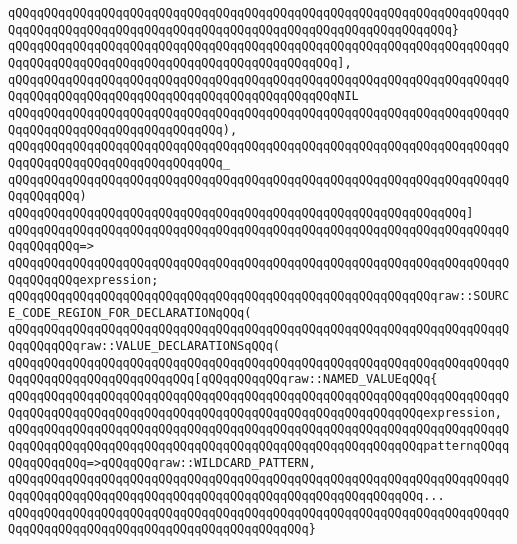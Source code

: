 \verb|qQQqqQQqqQQqqQQqqQQqqQQqqQQqqQQqqQQqqQQqqQQqqQQqqQQqqQQqqQQqqQQqqQQqqQQqqQQqqQQqqQQqqQQqqQQqqQQqqQQqqQQqqQQqqQQqqQQqqQQqqQQqqQQqqQQq}|\newline
\verb|qQQqqQQqqQQqqQQqqQQqqQQqqQQqqQQqqQQqqQQqqQQqqQQqqQQqqQQqqQQqqQQqqQQqqQQqqQQqqQQqqQQqqQQqqQQqqQQqqQQqqQQqqQQqqQQqqQQq],|\newline
\verb|qQQqqQQqqQQqqQQqqQQqqQQqqQQqqQQqqQQqqQQqqQQqqQQqqQQqqQQqqQQqqQQqqQQqqQQqqQQqqQQqqQQqqQQqqQQqqQQqqQQqqQQqqQQqqQQqqQQqNIL|\newline
\verb|qQQqqQQqqQQqqQQqqQQqqQQqqQQqqQQqqQQqqQQqqQQqqQQqqQQqqQQqqQQqqQQqqQQqqQQqqQQqqQQqqQQqqQQqqQQqqQQqqQQq),|\newline
\verb|qQQqqQQqqQQqqQQqqQQqqQQqqQQqqQQqqQQqqQQqqQQqqQQqqQQqqQQqqQQqqQQqqQQqqQQqqQQqqQQqqQQqqQQqqQQqqQQqqQQq_|\newline
\verb|qQQqqQQqqQQqqQQqqQQqqQQqqQQqqQQqqQQqqQQqqQQqqQQqqQQqqQQqqQQqqQQqqQQqqQQqqQQqqQQq)|\newline
\verb|qQQqqQQqqQQqqQQqqQQqqQQqqQQqqQQqqQQqqQQqqQQqqQQqqQQqqQQqqQQqqQQq]|\newline
\verb|qQQqqQQqqQQqqQQqqQQqqQQqqQQqqQQqqQQqqQQqqQQqqQQqqQQqqQQqqQQqqQQqqQQqqQQqqQQqqQQq=>|\newline
\verb|qQQqqQQqqQQqqQQqqQQqqQQqqQQqqQQqqQQqqQQqqQQqqQQqqQQqqQQqqQQqqQQqqQQqqQQqqQQqqQQqexpression;|\newline
\newline
\verb|qQQqqQQqqQQqqQQqqQQqqQQqqQQqqQQqqQQqqQQqqQQqqQQqqQQqqQQqqQQqraw::SOURCE_CODE_REGION_FOR_DECLARATIONqQQq(|\newline
\verb|qQQqqQQqqQQqqQQqqQQqqQQqqQQqqQQqqQQqqQQqqQQqqQQqqQQqqQQqqQQqqQQqqQQqqQQqqQQqqQQqraw::VALUE_DECLARATIONSqQQq(|\newline
\verb|qQQqqQQqqQQqqQQqqQQqqQQqqQQqqQQqqQQqqQQqqQQqqQQqqQQqqQQqqQQqqQQqqQQqqQQqqQQqqQQqqQQqqQQqqQQqqQQq[qQQqqQQqqQQqraw::NAMED_VALUEqQQq{|\newline
\verb|qQQqqQQqqQQqqQQqqQQqqQQqqQQqqQQqqQQqqQQqqQQqqQQqqQQqqQQqqQQqqQQqqQQqqQQqqQQqqQQqqQQqqQQqqQQqqQQqqQQqqQQqqQQqqQQqqQQqqQQqqQQqqQQqexpression,|\newline
\verb|qQQqqQQqqQQqqQQqqQQqqQQqqQQqqQQqqQQqqQQqqQQqqQQqqQQqqQQqqQQqqQQqqQQqqQQqqQQqqQQqqQQqqQQqqQQqqQQqqQQqqQQqqQQqqQQqqQQqqQQqqQQqqQQqpatternqQQqqQQqqQQqqQQq=>qQQqqQQqraw::WILDCARD_PATTERN,|\newline
\verb|qQQqqQQqqQQqqQQqqQQqqQQqqQQqqQQqqQQqqQQqqQQqqQQqqQQqqQQqqQQqqQQqqQQqqQQqqQQqqQQqqQQqqQQqqQQqqQQqqQQqqQQqqQQqqQQqqQQqqQQqqQQqqQQq...|\newline
\verb|qQQqqQQqqQQqqQQqqQQqqQQqqQQqqQQqqQQqqQQqqQQqqQQqqQQqqQQqqQQqqQQqqQQqqQQqqQQqqQQqqQQqqQQqqQQqqQQqqQQqqQQqqQQqqQQq}|\newline
